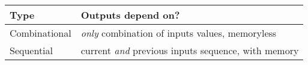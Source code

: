 \begin{tabular}[h]{lp{7cm}}
  \hline
  Type & Outputs depend on?  \\
  \hline
  Combinational & \emph{only} combination of inputs values, memoryless  \\
  Sequential & current \emph{and} previous inputs sequence, with memory \\
  \hline
\end{tabular}
